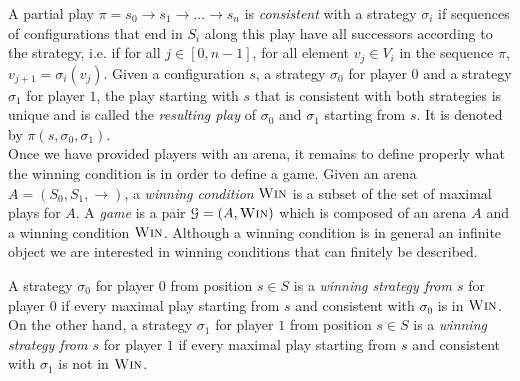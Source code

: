 \documentclass[a4paper,UKenglish,cleveref, autoref, thm-restate]{lipics-v2021}
\newcommand{\win}{\textsc{Win}}
\begin{document}
A partial play $\pi = s_0 \rightarrow s_1 \rightarrow \ldots \rightarrow s_n$ is {\em consistent} with a strategy $\sigma_i$ if sequences of configurations that end in $S_i$ along this play have all successors according to the strategy, i.e.
if for all $j\in[0,n-1]$, for all element $v_j \in V_i$ in the sequence $\pi$,
$v_{j+1} = \sigma_i(v_j)$.
 Given a configuration $s$,   a strategy $\sigma_0$ for player $0$ and a strategy $\sigma_1$ for player $1$, the play starting with $s$ that is consistent with both strategies is unique and is called the {\em resulting play} of $\sigma_0$ and $\sigma_1$ starting from $s$. It is 
denoted by $\pi(s, \sigma_0, \sigma_1)$.\\


Once we have provided players with an arena, it remains to define  properly what the winning condition is in order to define a game. Given an arena $A = (S_0, S_1, \rightarrow)$, a {\em winning condition}
$\win$
is a subset  
of the set of maximal plays for $A$. A {\em game} is a pair $\mathcal{G}= (A, \win)$ which is composed of an arena $A$ and a winning condition $\win$.
Although a winning condition is in general an infinite object we are interested in winning conditions 
that can finitely be described.





A strategy $\sigma_0$ for player $0$ from position $s \in S$ is a {\em winning strategy
 from $s$} for player $0$ if 
every maximal play starting from $s$ and consistent with $\sigma_0$ is in $\win$.
On the other hand, a strategy $\sigma_1$ for player $1$ from position $s \in S$ is a {\em winning strategy
 from $s$} for player $1$ if 
every maximal play starting from $s$ and consistent with $\sigma_1$ is not in $\win$.
 




\end{document}
